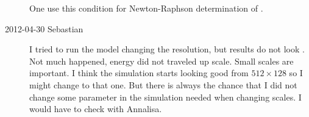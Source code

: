 \begin{description}

One use this condition for Newton-Raphson determination of \sspRed.

\item[2012-04-30 Sebastian]
I tried to run the model changing the resolution, but results
do not look . Not much happened, energy did not traveled up scale.
Small scales are important. I think the simulation starts looking good
from $512 \times 128$ so I might change to that one. But there is always the
chance that I did not change some parameter in the simulation needed when
changing scales. I would have to check with Annalisa.

\end{description}
